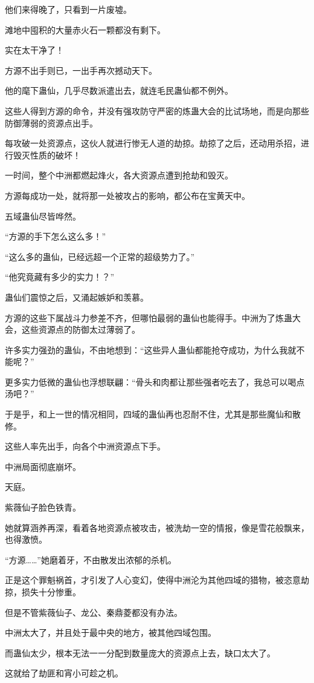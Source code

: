 \begin{this_body}
他们来得晚了，只看到一片废墟。

滩地中囤积的大量赤火石一颗都没有剩下。

实在太干净了！

方源不出手则已，一出手再次撼动天下。

他的麾下蛊仙，几乎尽数派遣出去，就连毛民蛊仙都不例外。

这些人得到方源的命令，并没有强攻防守严密的炼蛊大会的比试场地，而是向那些防御薄弱的资源点出手。

每攻破一处资源点，这伙人就进行惨无人道的劫掠。劫掠了之后，还动用杀招，进行毁灭性质的破坏！

一时间，整个中洲都燃起烽火，各大资源点遭到抢劫和毁灭。

方源每成功一处，就将那一处被攻占的影响，都公布在宝黄天中。

五域蛊仙尽皆哗然。

“方源的手下怎么这么多！”

“这么多的蛊仙，已经远超一个正常的超级势力了。”

“他究竟藏有多少的实力！？”

蛊仙们震惊之后，又涌起嫉妒和羡慕。

方源的这些下属战斗力参差不齐，但哪怕最弱的蛊仙也能得手。中洲为了炼蛊大会，这些资源点的防御太过薄弱了。

许多实力强劲的蛊仙，不由地想到：“这些异人蛊仙都能抢夺成功，为什么我就不能呢？”

更多实力低微的蛊仙也浮想联翩：“骨头和肉都让那些强者吃去了，我总可以喝点汤吧？”

于是乎，和上一世的情况相同，四域的蛊仙再也忍耐不住，尤其是那些魔仙和散修。

这些人率先出手，向各个中洲资源点下手。

中洲局面彻底崩坏。

天庭。

紫薇仙子脸色铁青。

她就算涵养再深，看着各地资源点被攻击，被洗劫一空的情报，像是雪花般飘来，也得激愤。

“方源……”她磨着牙，不由散发出浓郁的杀机。

正是这个罪魁祸首，才引发了人心变幻，使得中洲沦为其他四域的猎物，被恣意劫掠，损失十分惨重。

但是不管紫薇仙子、龙公、秦鼎菱都没有办法。

中洲太大了，并且处于最中央的地方，被其他四域包围。

而蛊仙太少，根本无法一一分配到数量庞大的资源点上去，缺口太大了。

这就给了劫匪和宵小可趁之机。


\end{this_body}

